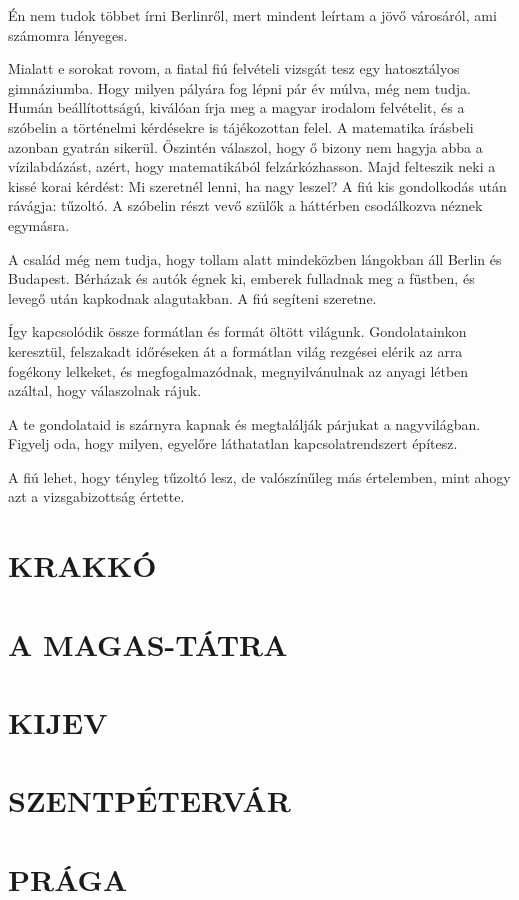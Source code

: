 Én nem tudok többet írni Berlinről, mert mindent leírtam a jövő
városáról, ami számomra lényeges.

Mialatt e sorokat rovom, a fiatal fiú felvételi vizsgát tesz egy hatosztályos
gimnáziumba. Hogy milyen pályára fog lépni pár év múlva,
még nem tudja. Humán beállítottságú, kiválóan írja meg a magyar irodalom
felvételit, és a szóbelin a történelmi kérdésekre is tájékozottan
felel. A matematika írásbeli azonban gyatrán sikerül. Őszintén válaszol,
hogy ő bizony nem hagyja abba a vízilabdázást, azért, hogy matematikából
felzárkózhasson. Majd felteszik neki a kissé korai kérdést:
Mi szeretnél lenni, ha nagy leszel? A fiú kis gondolkodás után rávágja:
tűzoltó. A szóbelin részt vevő szülők a háttérben csodálkozva néznek
egymásra.

A család még nem tudja, hogy tollam alatt mindeközben lángokban
áll Berlin és Budapest. Bérházak és autók égnek ki, emberek fulladnak
meg a füstben, és levegő után kapkodnak alagutakban. A fiú segíteni
szeretne.

Így kapcsolódik össze formátlan és formát öltött világunk. Gondolatainkon
keresztül, felszakadt időréseken át a formátlan világ rezgései
elérik az arra fogékony lelkeket, és megfogalmazódnak, megnyilvánulnak
az anyagi létben azáltal, hogy válaszolnak rájuk.

A te gondolataid is szárnyra kapnak és megtalálják párjukat a nagyvilágban.
Figyelj oda, hogy milyen, egyelőre láthatatlan kapcsolatrendszert
építesz.

A fiú lehet, hogy tényleg tűzoltó lesz, de valószínűleg más értelemben,
mint ahogy azt a vizsgabizottság értette.

\chapter{KRAKKÓ}

\chapter{A MAGAS-TÁTRA}

\chapter{KIJEV}

\chapter{SZENTPÉTERVÁR}

\chapter{PRÁGA}

